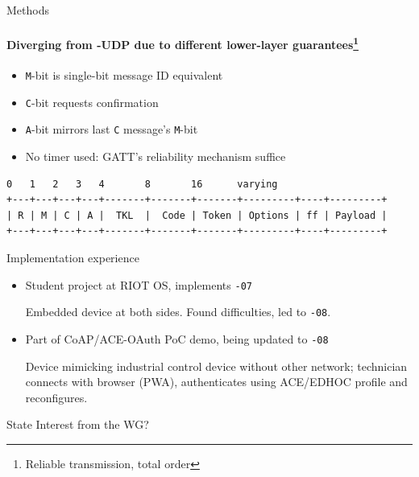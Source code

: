 \begin{frame}[fragile]{Methods}\Large
  \framesubtitle{Diverging from -UDP due to different lower-layer guarantees\footnote{Reliable transmission, total order}}
  \begin{itemize}
    \item \texttt{M}-bit is single-bit message ID equivalent
    \item \texttt{C}-bit requests confirmation
    \item \texttt{A}-bit mirrors last \texttt{C} message's \texttt{M}-bit
    \item No timer used: GATT's reliability mechanism suffice
  \end{itemize}

\bigskip

\large
  \begin{verbatim}
0   1   2   3   4       8       16      varying
+---+---+---+---+-------+-------+-------+---------+----+---------+
| R | M | C | A |  TKL  |  Code | Token | Options | ff | Payload |
+---+---+---+---+-------+-------+-------+---------+----+---------+
  \end{verbatim}

\end{frame}

\begin{frame}{Implementation experience}\Large
  \begin{itemize}
    \item Student project at RIOT OS, implements \texttt{-07}

      Embedded device at both sides. Found difficulties, led to \texttt{-08}.

      \bigskip

    \item Part of CoAP/ACE-OAuth PoC demo, being updated to \texttt{-08}

      Device mimicking industrial control device without other network;
      technician connects with browser (PWA), authenticates using ACE/EDHOC profile and reconfigures.
  \end{itemize}
\end{frame}


\begin{frame}{State}\Huge
  Interest from the WG?
\end{frame}


